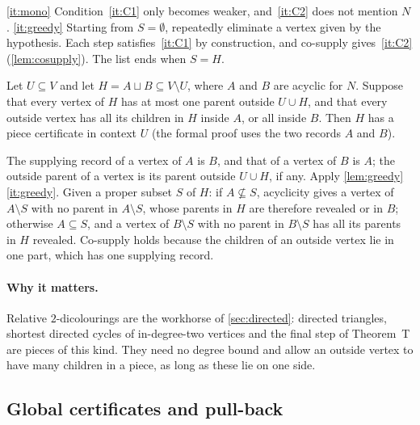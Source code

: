 \begin{outline}
\ref{it:mono} Condition~\ref{it:C1} only becomes weaker, and~\ref{it:C2} does not mention $N$.
\ref{it:greedy} Starting from $S=\emptyset$, repeatedly eliminate a vertex given by the hypothesis. Each step
satisfies~\ref{it:C1} by construction, and co-supply gives~\ref{it:C2} (\cref{lem:cosupply}). The list ends when $S=H$.
\end{outline}

\begin{lemma}\label{lem:Bdir}
Let $U\subseteq V$ and let $H=A\sqcup B\subseteq V\setminus U$, where $A$ and $B$ are acyclic for $N$. Suppose that
every vertex of $H$ has at most one parent outside $U\cup H$, and that every outside vertex has all its children in $H$
inside $A$, or all inside $B$. Then $H$ has a piece certificate in context $U$ (the formal proof uses the two records
$A$ and $B$).
\end{lemma}

\begin{outline}
The supplying record of a vertex of $A$ is $B$, and that of a vertex of $B$ is $A$; the outside parent of a vertex is
its parent outside $U\cup H$, if any. Apply \cref{lem:greedy}\ref{it:greedy}. Given a proper subset $S$ of $H$: if
$A\not\subseteq S$, acyclicity gives a vertex of $A\setminus S$ with no parent in $A\setminus S$, whose parents in $H$
are therefore revealed or in $B$; otherwise $A\subseteq S$, and a vertex of $B\setminus S$ with no parent in
$B\setminus S$ has all its parents in $H$ revealed. Co-supply holds because the children of an outside vertex lie in
one part, which has one supplying record.
\end{outline}

\paragraph{Why it matters.} Relative $2$-dicolourings are the workhorse of \cref{sec:directed}: directed triangles,
shortest directed cycles of in-degree-two vertices and the final step of Theorem~T are pieces of this kind. They need no
degree bound and allow an outside vertex to have many children in a piece, as long as these lie on one side.

\subsection{Global certificates and pull-back}\label{sec:global}

